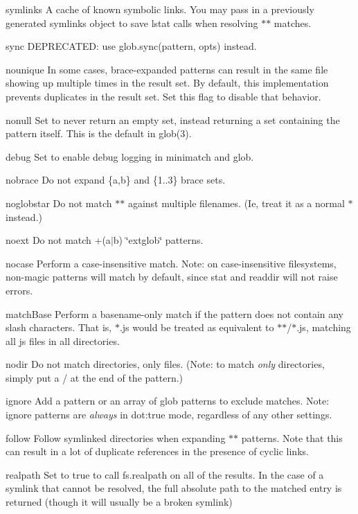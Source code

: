 \begin{DoxyItemize}
\item {\ttfamily symlinks} A cache of known symbolic links. You may pass in a previously generated {\ttfamily symlinks} object to save {\ttfamily lstat} calls when resolving {\ttfamily $\ast$$\ast$} matches.
\item {\ttfamily sync} D\+E\+P\+R\+E\+C\+A\+T\+ED\+: use {\ttfamily glob.\+sync(pattern, opts)} instead.
\item {\ttfamily nounique} In some cases, brace-\/expanded patterns can result in the same file showing up multiple times in the result set. By default, this implementation prevents duplicates in the result set. Set this flag to disable that behavior.
\item {\ttfamily nonull} Set to never return an empty set, instead returning a set containing the pattern itself. This is the default in glob(3).
\item {\ttfamily debug} Set to enable debug logging in minimatch and glob.
\item {\ttfamily nobrace} Do not expand {\ttfamily \{a,b\}} and {\ttfamily \{1..3\}} brace sets.
\item {\ttfamily noglobstar} Do not match {\ttfamily $\ast$$\ast$} against multiple filenames. (Ie, treat it as a normal {\ttfamily $\ast$} instead.)
\item {\ttfamily noext} Do not match {\ttfamily +(a$\vert$b)} \char`\"{}extglob\char`\"{} patterns.
\item {\ttfamily nocase} Perform a case-\/insensitive match. Note\+: on case-\/insensitive filesystems, non-\/magic patterns will match by default, since {\ttfamily stat} and {\ttfamily readdir} will not raise errors.
\item {\ttfamily match\+Base} Perform a basename-\/only match if the pattern does not contain any slash characters. That is, {\ttfamily $\ast$.js} would be treated as equivalent to {\ttfamily $\ast$$\ast$/$\ast$.js}, matching all js files in all directories.
\item {\ttfamily nodir} Do not match directories, only files. (Note\+: to match {\itshape only} directories, simply put a {\ttfamily /} at the end of the pattern.)
\item {\ttfamily ignore} Add a pattern or an array of glob patterns to exclude matches. Note\+: {\ttfamily ignore} patterns are {\itshape always} in {\ttfamily dot\+:true} mode, regardless of any other settings.
\item {\ttfamily follow} Follow symlinked directories when expanding {\ttfamily $\ast$$\ast$} patterns. Note that this can result in a lot of duplicate references in the presence of cyclic links.
\item {\ttfamily realpath} Set to true to call {\ttfamily fs.\+realpath} on all of the results. In the case of a symlink that cannot be resolved, the full absolute path to the matched entry is returned (though it will usually be a broken symlink)
\end{DoxyItemize}

